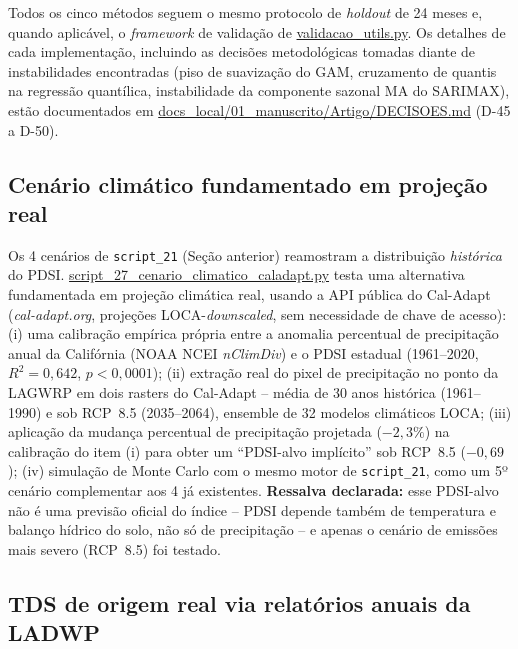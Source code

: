 Todos os cinco métodos seguem o mesmo protocolo de \textit{holdout} de 24 meses e, quando aplicável, o \textit{framework} de validação de \url{validacao_utils.py}. Os detalhes de cada implementação, incluindo as decisões metodológicas tomadas diante de instabilidades encontradas (piso de suavização do GAM, cruzamento de quantis na regressão quantílica, instabilidade da componente sazonal MA do SARIMAX), estão documentados em \url{docs_local/01_manuscrito/Artigo/DECISOES.md} (D-45 a D-50).

\subsection{Cenário climático fundamentado em projeção real}

Os 4 cenários de \texttt{script\_21} (Seção anterior) reamostram a distribuição \textit{histórica} do PDSI. \url{script_27_cenario_climatico_caladapt.py} testa uma alternativa fundamentada em projeção climática real, usando a API pública do Cal-Adapt (\textit{cal-adapt.org}, projeções LOCA-\textit{downscaled}, sem necessidade de chave de acesso): (i) uma calibração empírica própria entre a anomalia percentual de precipitação anual da Califórnia (NOAA NCEI \textit{nClimDiv}) e o PDSI estadual (1961--2020, $R^2=0{,}642$, $p<0{,}0001$); (ii) extração real do pixel de precipitação no ponto da LAGWRP em dois rasters do Cal-Adapt -- média de 30 anos histórica (1961--1990) e sob RCP~8.5 (2035--2064), ensemble de 32 modelos climáticos LOCA; (iii) aplicação da mudança percentual de precipitação projetada ($-2{,}3\%$) na calibração do item (i) para obter um ``PDSI-alvo implícito'' sob RCP~8.5 ($-0{,}69$); (iv) simulação de Monte Carlo com o mesmo motor de \texttt{script\_21}, como um 5º cenário complementar aos 4 já existentes. \textbf{Ressalva declarada:} esse PDSI-alvo não é uma previsão oficial do índice -- PDSI depende também de temperatura e balanço hídrico do solo, não só de precipitação -- e apenas o cenário de emissões mais severo (RCP~8.5) foi testado.

\subsection{TDS de origem real via relatórios anuais da LADWP}

